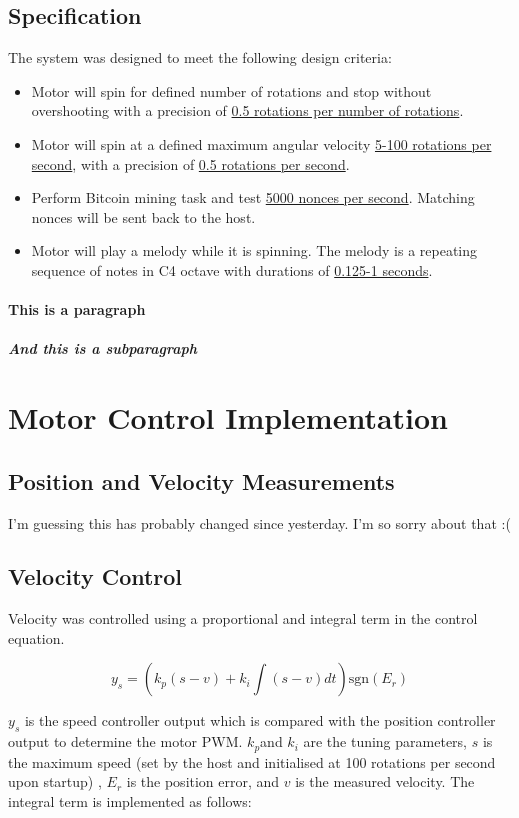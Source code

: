 \documentclass{article}
\begin{document}
\subsection{Specification}
\noindent The system was designed to meet the following design criteria:
 \begin{itemize}
	\item Motor will spin for defined number of rotations and stop without overshooting with a precision of \underline{0.5 rotations per number of rotations}.
	\item Motor will spin at a defined maximum angular velocity \underline{5-100 rotations per second}, with a precision of \underline{0.5 rotations per second}.
	\item Perform Bitcoin mining task and test \underline{5000 nonces per second}. Matching nonces will be sent back to the host.
	\item Motor will play a melody while it is spinning. The melody is a repeating sequence of notes in C4 octave with durations of \underline{0.125-1 seconds}.
\end{itemize}

\paragraph{This is a paragraph}
\lipsum[2]

\subparagraph{And this is a subparagraph}
\lipsum[3]




\section{Motor Control Implementation}
\subsection{Position and Velocity Measurements}

I'm guessing this has probably changed since yesterday. I'm so sorry about that :(

\subsection{Velocity Control}

Velocity was controlled using a proportional and integral term in the control equation.

\[ y_s = \left( k_p(s-v)+ k_i\int(s-v)dt\right)\textrm{sgn}(E_r)\]

\(y_s\) is the speed controller output which is compared with the position controller output to determine the motor PWM. \(k_p\)and \(k_i\) are the tuning parameters, \(s\) is the maximum speed (set by the host and initialised at 100 rotations per second upon startup) , \(E_r\) is the position error, and \(v\) is the measured velocity. The integral term is implemented as follows:
\end{document}
